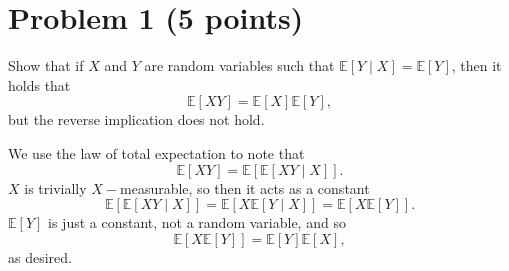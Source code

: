 \documentclass[11pt]{article}
\newcommand{\bbE}{\mathbb{E}}
\begin{document}
	
	
	\psetheader
\section*{Problem 1 (5 points)}
Show that if \(X\) and \(Y\) are random variables such that \(\mathbb{E}[Y \mid X] = \mathbb{E}[Y]\), then it holds that
\[
\mathbb{E}[XY] = \mathbb{E}[X] \mathbb{E}[Y],
\]
but the reverse implication does not hold.

\begin{solution}
    We use the law of total expectation to note that 
    \[\bbE[XY] = \bbE[\bbE[XY \mid X]].\] $X$ is trivially $X-$measurable, so then it acts as a constant 
    \[\bbE[\bbE[XY \mid X]] = \bbE[X \bbE[Y \mid X]] = \bbE[X \bbE[Y]].\] $\bbE[Y]$ is just a constant, not a random variable, and so 
    \[\bbE[X \bbE[Y]] = \bbE[Y]\bbE[X],\] as desired. 
\end{solution}

\newpage
\end{document}
